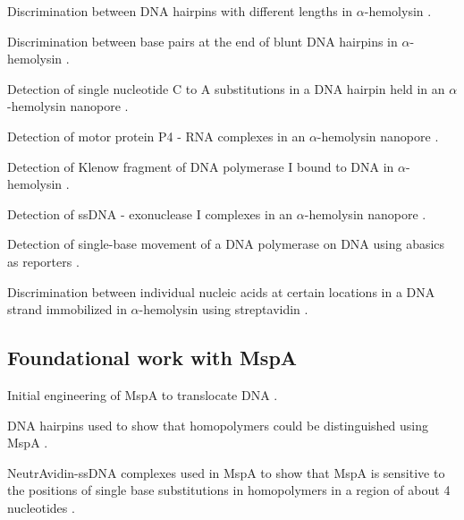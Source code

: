 Discrimination between DNA hairpins with different lengths in $\alpha$-hemolysin \citep{Vercoutere2001}.

Discrimination between base pairs at the end of blunt DNA hairpins in $\alpha$-hemolysin \citep{Vercoutere2003}.

Detection of single nucleotide C to A substitutions in a DNA hairpin held in an $\alpha$-hemolysin nanopore \citep{Ashkenasy2005}.

Detection of motor protein P4 - RNA complexes in an $\alpha$-hemolysin nanopore \citep{Astier2007}.

Detection of Klenow fragment of DNA polymerase I bound to DNA in $\alpha$-hemolysin \citep{Benner2007}.

Detection of ssDNA - exonuclease I complexes in an $\alpha$-hemolysin nanopore \citep{Hornblower2007}.

Detection of single-base movement of a DNA polymerase on DNA using abasics as reporters \citep{Cockroft2008}.

Discrimination between individual nucleic acids at certain locations in a DNA strand immobilized in $\alpha$-hemolysin using streptavidin \citep{Stoddart2009}.

\subsection{Foundational work with MspA}

Initial engineering of MspA to translocate DNA \citep{Butler2008}.

DNA hairpins used to show that homopolymers could be distinguished using MspA \citep{Derrington2010}.

NeutrAvidin-ssDNA complexes used in MspA to show that MspA is sensitive to the positions of single base substitutions in homopolymers in a region of about 4 nucleotides \citep{Manrao2011}.

%
%
%
%
%
%
%
%


